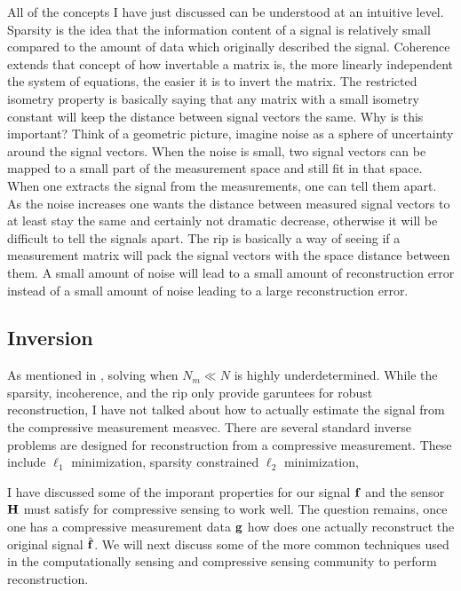 All of the concepts I have just discussed can be understood at an intuitive level. Sparsity is the idea that the information content of a signal is relatively small compared to the amount of data which originally described the signal. Coherence extends that concept of how invertable a matrix is, the more linearly independent the system of equations, the easier it is to invert the matrix. The restricted isometry property is basically saying that any matrix with a small isometry constant will keep the distance between signal vectors the same. Why is this important? Think of a geometric picture, imagine noise as a sphere of uncertainty around the signal vectors. When the noise is small, two signal vectors can be mapped to a small part of the measurement space and still fit in that space. When one extracts the signal from the measurements, one can tell them apart. As the noise increases one wants the distance between measured signal vectors to at least stay the same and certainly not dramatic decrease, otherwise it will be difficult to tell the signals apart. The \gls{rip} is basically a way of seeing if a measurement matrix will pack the signal vectors with the space distance between them. A small amount of noise will lead to a small amount of reconstruction error instead of a small amount of noise leading to a large reconstruction error. 



\subsection{Inversion}

As mentioned in , solving  when $N_m \ll N$ is highly underdetermined. While the sparsity, incoherence, and the \gls{rip} only provide garuntees for robust reconstruction, I have not talked about how to actually estimate the signal from the compressive measurement \gls{measvec}. There are several standard inverse problems are designed for reconstruction from a compressive measurement. These include $\ell_1$ minimization, sparsity constrained $\ell_2$ minimization, 

I have discussed some of the imporant properties for our signal $\mathbf{f}$ and the sensor $\mathbf{H}$ must satisfy for compressive sensing to work well. The question remains, once one has a compressive measurement data $\mathbf{g}$ how does one actually reconstruct the original signal $\hat{ \mathbf{f} }$. We will next discuss some of the more common techniques used in the computationally sensing and compressive sensing community to perform reconstruction. 

